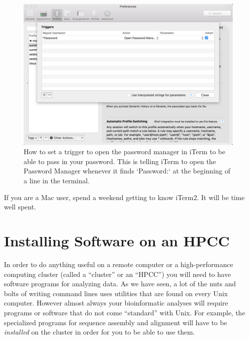 \documentclass[]{krantz}
\begin{document}
\begin{figure}
\includegraphics[width=25.64in]{figs/iterm-pw-trigger} \caption{How to set a trigger to open the password manager in iTerm to be able to pass in your password.  This is telling iTerm to open the Password Manager whenever it finds `Password:` at the beginning of a line in the terminal.}\label{fig:iterm-trigger}
\end{figure}

If you are a Mac user, spend a weekend getting to know iTerm2. It will be time well spent.

\hypertarget{installing-software-on-an-hpcc}{%
\section{Installing Software on an HPCC}\label{installing-software-on-an-hpcc}}

In order to do anything useful on a remote computer or a
high-performance computing cluster (called a ``cluster'' or an ``HPCC'')
you will need to have software programs
for analyzing data. As we have seen, a lot of the nuts and bolts of writing command
lines uses utilities that are found on every Unix computer. However almost always
your bioinformatic analyses will require programs or software that
do not come ``standard'' with Unix. For example, the specialized programs for
sequence assembly and alignment will have to be \emph{installed} on the cluster
in order for you to be able to use them.
\end{document}
